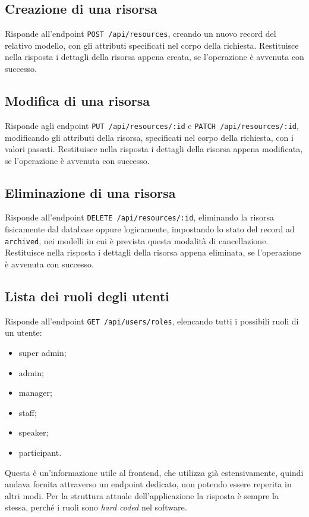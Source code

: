 \subsection{Creazione di una risorsa} \label{api:creazione}
Risponde all'endpoint \verb|POST /api/resources|, creando un nuovo record del relativo modello, con gli attributi specificati nel corpo della richiesta. Restituisce nella risposta i dettagli della risorsa appena creata, se l'operazione è avvenuta con successo.

\subsection{Modifica di una risorsa} \label{api:modifica}
Risponde agli endpoint \verb|PUT /api/resources/:id| e \verb|PATCH /api/resources/:id|, modificando gli attributi della risorsa, specificati nel corpo della richiesta, con i valori passati. Restituisce nella risposta i dettagli della risorsa appena modificata, se l'operazione è avvenuta con successo.

\subsection{Eliminazione di una risorsa} \label{api:eliminazione}
Risponde all'endpoint \verb|DELETE /api/resources/:id|, eliminando la risorsa fisicamente dal database oppure logicamente, impostando lo stato del record ad \verb|archived|, nei modelli in cui è prevista questa modalità di cancellazione. Restituisce nella risposta i dettagli della risorsa appena eliminata, se l'operazione è avvenuta con successo.

\subsection{Lista dei ruoli degli utenti} \label{api:utenti-lista-ruoli}
Risponde all'endpoint \verb|GET /api/users/roles|, elencando tutti i possibili ruoli di un utente:
\begin{itemize}
	\item super admin;
	\item admin;
	\item manager;
	\item staff;
	\item speaker;
	\item participant.
\end{itemize}
Questa è un'informazione utile al frontend, che utilizza già estensivamente, quindi andava fornita attraverso un endpoint dedicato, non potendo essere reperita in altri modi. Per la struttura attuale dell'applicazione la risposta è sempre la stessa, perché i ruoli sono \emph{hard coded} nel software.

